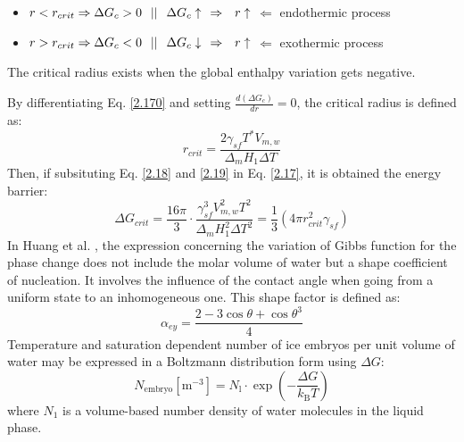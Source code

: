 \begin{itemize}
	\item $r < r_{crit} \Rightarrow \Delta G_{c} > 0 \hspace{0.25cm} || \hspace{0.25cm} \Delta G_{c} \uparrow \hspace{0.25cm} \Rightarrow \hspace{0.25cm} r \uparrow $ $\Leftarrow$ endothermic process
	\item $r > r_{crit} \Rightarrow \Delta G_{c} < 0 \hspace{0.25cm} || \hspace{0.25cm} \Delta G_{c} \downarrow \hspace{0.25cm} \Rightarrow \hspace{0.25cm} r \uparrow $ $\Leftarrow$ exothermic process
\end{itemize}
The critical radius exists when the global enthalpy variation gets negative.

\noindent By differentiating Eq. \ref{2.170} and setting $\frac{d(\Delta G_c)}{dr} = 0$, the critical radius is defined as:
\begin{equation}
	\label{2.19}
	r_{c r i t}=\frac{2 \gamma_{s f} T^{*} V_{m, w}}{\Delta_{m} H_{1} \Delta T}
\end{equation}
Then, if subsituting Eq. \ref{2.18} and \ref{2.19} in Eq. \ref{2.17}, it is obtained the energy barrier:
\begin{equation}
	\label{2.20}
	\Delta G_{c r i t}=\frac{16 \pi}{3} \cdot \frac{\gamma_{s f}^{3} V_{m, w}^{2} T^{2}}{\Delta_{m} H_{1}^{2} \Delta T^{2}}=\frac{1}{3}\left(4 \pi r_{c r i t}^{2} \gamma_{s f}\right)
\end{equation}
In Huang et al. \cite{huang_wang_li_2020}, the expression concerning the variation of Gibbs function for the phase change does not include the molar volume of water but a shape coefficient of nucleation. It involves the influence of the contact angle when going from a uniform state to an inhomogeneous one. This shape factor is defined as:
\begin{equation}
	\label{2.21}
	\alpha_{e y}=\frac{2-3 \cos \theta+\cos \theta^{3}}{4}
\end{equation}
Temperature and saturation dependent number of ice embryos per unit volume of water may be expressed in a Boltzmann distribution form using $\Delta G$:
\begin{equation}
	\label{2.22}
	N_{\mathrm{embryo}}\left[\mathrm{m}^{-3}\right]=N_{\mathrm{l}} \cdot \exp \left(-\frac{\Delta G}{k_{\mathrm{B}} T}\right)
\end{equation}
where $N_{1}$ is a volume-based number density of water molecules in the liquid phase.

